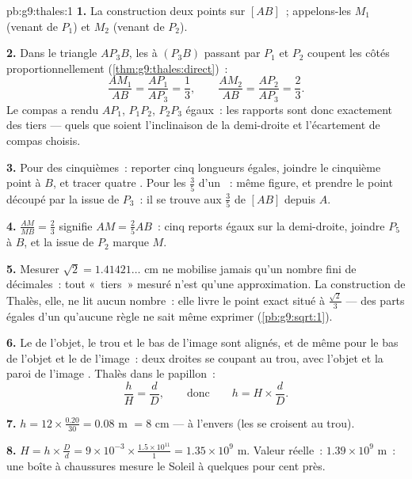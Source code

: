 \begin{solution}{pb:g9:thales:1}
\textbf{1.} La construction  deux points sur $[AB]$~;
appelons-les $M_1$ (venant de $P_1$) et $M_2$ (venant de $P_2$).

\textbf{2.} Dans le triangle $A P_3 B$, les  à
$(P_3 B)$ passant par $P_1$ et $P_2$ coupent les côtés
proportionnellement (\cref{thm:g9:thales:direct})~:
\[
\frac{A M_1}{AB} = \frac{A P_1}{A P_3} = \frac13,
\qquad
\frac{A M_2}{AB} = \frac{A P_2}{A P_3} = \frac23 .
\]
Le compas a rendu $A P_1$, $P_1 P_2$, $P_2 P_3$ égaux~: les rapports
sont donc exactement des tiers --- quels que soient l'inclinaison de
la demi-droite et l'écartement de compas choisis.

\textbf{3.} Pour des cinquièmes~: reporter cinq longueurs égales,
joindre le cinquième point à $B$, et tracer quatre . Pour
les $\frac35$ d'un ~: même figure, et prendre le point
découpé par la  issue de $P_3$~: il se trouve aux
$\frac{3}{5}$ de $[AB]$ depuis $A$.

\textbf{4.} $\frac{AM}{MB} = \frac23$ signifie
$AM = \frac25 AB$~: cinq reports égaux sur la demi-droite, joindre
$P_5$ à $B$, et la  issue de $P_2$ marque $M$.

\textbf{5.} Mesurer $\sqrt2 = 1.41421\ldots$ cm ne mobilise jamais
qu'un nombre fini de décimales~: tout «~tiers~» mesuré n'est qu'une
approximation. La construction de Thalès, elle, ne lit aucun
nombre~: elle livre le point exact situé à $\frac{\sqrt2}{3}$ --- des
parts égales d'un  qu'aucune règle ne sait même exprimer
(\cref{pb:g9:sqrt:1}).

\textbf{6.} Le  de l'objet, le trou et le bas de l'image sont
alignés, et de même pour le bas de l'objet et le  de l'image~:
deux droites se coupant au trou, avec l'objet et la paroi de l'image
. Thalès dans le papillon~:
\[
\frac{h}{H} = \frac{d}{D},
\qquad\text{donc}\qquad
h = H \times \frac dD .
\]

\textbf{7.} $h = 12 \times \frac{0.20}{30} = 0.08$ m $= 8$ cm --- à
l'envers (les  se croisent au trou).

\textbf{8.} $H = h \times \frac Dd = 9 \times 10^{-3} \times
\frac{1.5 \times 10^{11}}{1} = 1.35 \times 10^{9}$ m. Valeur
réelle~: $1.39 \times 10^9$ m~: une boîte à chaussures mesure le
Soleil à quelques pour cent près.


\end{solution}
